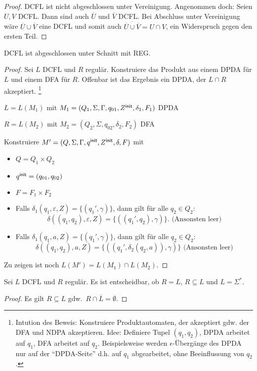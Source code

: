 {{\begin{proof}
    DCFL ist nicht abgeschlossen unter Vereinigung. Angenommen doch: Seien $U, V$ DCFL. Dann sind auch $\overline{U}$ und $\overline{V}$ DCFL. Bei Abschluss unter Vereinigung wäre $\overline{U} \cup \overline{V}$ eine DCFL und somit auch $\overline{\overline{U} \cup \overline{V}} = U \cap V$, ein Widerspruch gegen den ersten Teil.
\end{proof}
\begin{Satz}
    DCFL ist abgeschlossen unter Schnitt mit REG.
\end{Satz}
\begin{proof}
    Sei $L$ DCFL und $R$ regulär.
    Konstruiere das Produkt aus einem DPDA für $L$ und einem DFA für $R$.
    Offenbar ist das Ergebnis ein DPDA, der $L\cap R$ akzeptiert. \footnote{
    Intution des Beweis: Konstruiere Produktautomaten, der akzeptiert gdw. der DFA und NDPA akzeptieren. Idee: Definiere Tupel $(q_1, q_2)$, DPDA arbeitet auf $q_1$, DFA arbeitet auf $q_2$. Beispielsweise werden $\epsilon$-Übergänge des DPDA nur auf der "`DPDA-Seite"' d.h. auf $q_1$ abgearbeitet, ohne Beeinflussung von $q_2$.
    }

    $L = L (M_1)$ mit $M_1 = (Q_1, \Sigma, \Gamma, q_{01}, Z^\mathsf{init},
    \delta_1, F_1)$ \ac{DPDA}

    $R = L (M_2)$ mit $M_2 = (Q_2, \Sigma, q_{02}, \delta_2, F_2)$
    \ac{DFA}

    Konstruiere $M'= (Q, \Sigma, \Gamma, q^\mathsf{init}, Z^\mathsf{init}, \delta, F)$ mit
    \begin{itemize}
    \item $Q = Q_1 \times Q_2$
    \item $q^\mathsf{init} = (q_{01}, q_{02})$
    \item $F = F_1  \times F_2$
    \item Falls $\delta_1 (q_1, \varepsilon, Z) = \{(q_1', \gamma)\}$, dann gilt für alle $q_2\in Q_2$: 
      \[ \delta ((q_1, q_2), \varepsilon, Z)
      = \{((q_1', q_2), \gamma)\} \text{.     (Ansonsten leer)} \]
    \item Falls $\delta_1 (q_1, a, Z) = \{(q_1', \gamma)\}$, dann gilt für alle $q_2\in Q_2$: 
      \[ \delta ((q_1, q_2), a, Z) =
      \{((q_1', \delta_2 (q_2, a)), \gamma)\} \text{   (Ansonsten leer)} \]
    \end{itemize}
    Zu zeigen ist noch $L (M') = L (M_1) \cap L (M_2)$.
\end{proof}
\begin{Satz}
    Sei $L$ DCFL und $R$ regulär.
    Es ist entscheidbar, ob $R=L$, $R\subseteq L$ und $L=\Sigma^*$.
\end{Satz}
\begin{proof}
    Es gilt $R\subseteq L$ gdw.\ $R \cap \overline{L} = \emptyset$.
    

\end{proof}}}
